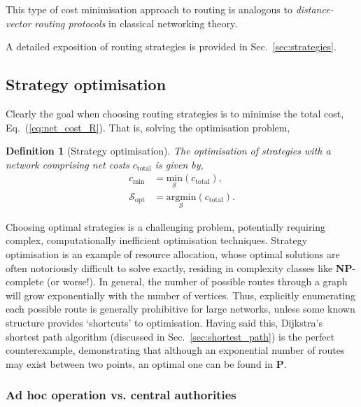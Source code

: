 \documentclass[aps, rmp, twocolumn, amsmath, amssymb, nofootinbib, superscriptaddress, longbibliography, floatfix, table-of-contents, eqsecnum]{revtex4-1}
\newtheorem{definition}{Definition}
\begin{document}
This type of cost minimisation approach to routing is analogous to \textit{distance-vector routing protocols} in classical networking theory.

A detailed exposition of routing strategies is provided in Sec.~\ref{sec:strategies}.

%
%

\subsection{Strategy optimisation} \label{sec:strat_opt}  

Clearly the goal when choosing routing strategies is to minimise the total cost, Eq.~(\ref{eq:net_cost_R}). That is, solving the optimisation problem,
\begin{definition}[Strategy optimisation]
The optimisation of strategies with a network comprising net costs $c_\text{total}$ is given by,
\begin{align}
c_\text{min} &= \underset{\mathcal{S}}{\text{min}}(c_\text{total}), \nonumber \\
\mathcal{S}_\text{opt} &= \underset{\mathcal{S}}{\text{argmin}} (c_\text{total}).
\end{align}
\end{definition}

Choosing optimal strategies is a challenging problem, potentially requiring complex, computationally inefficient optimisation techniques. Strategy optimisation is an example of resource allocation, whose optimal solutions are often notoriously difficult to solve exactly, residing in complexity classes like \textbf{NP}-complete (or worse!). In general, the number of possible routes through a graph will grow exponentially with the number of vertices. Thus, explicitly enumerating each possible route is generally prohibitive for large networks, unless some known structure provides `shortcuts' to optimisation. Having said this, Dijkstra's shortest path algorithm (discussed in Sec.~\ref{sec:shortest_path}) is the perfect counterexample, demonstrating that although an exponential number of routes may exist between two points, an optimal one can be found in \textbf{P}.

%
%

\subsubsection{Ad hoc operation vs. central authorities}  
\end{document}
